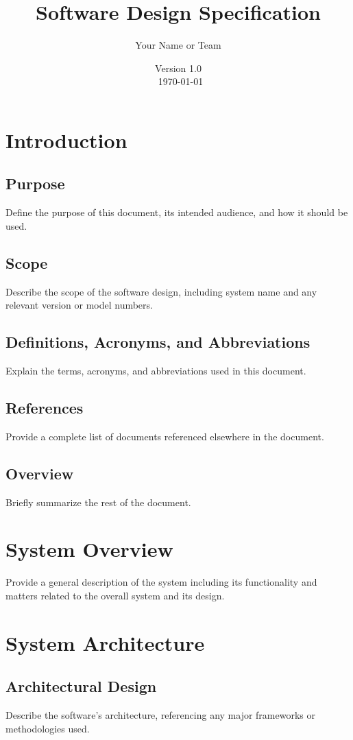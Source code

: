 \documentclass{article}
\title{Software Design Specification}
\author{Your Name or Team}
\date{Version 1.0 \\\ \today}
\begin{document}
\maketitle
\tableofcontents
\newpage

\section{Introduction}
\subsection{Purpose}
Define the purpose of this document, its intended audience, and how it should be used.

\subsection{Scope}
Describe the scope of the software design, including system name and any relevant version or model numbers.

\subsection{Definitions, Acronyms, and Abbreviations}
Explain the terms, acronyms, and abbreviations used in this document.

\subsection{References}
Provide a complete list of documents referenced elsewhere in the document.

\subsection{Overview}
Briefly summarize the rest of the document.

\section{System Overview}
Provide a general description of the system including its functionality and matters related to the overall system and its design.

\section{System Architecture}
\subsection{Architectural Design}
Describe the software’s architecture, referencing any major frameworks or methodologies used.
\end{document}
